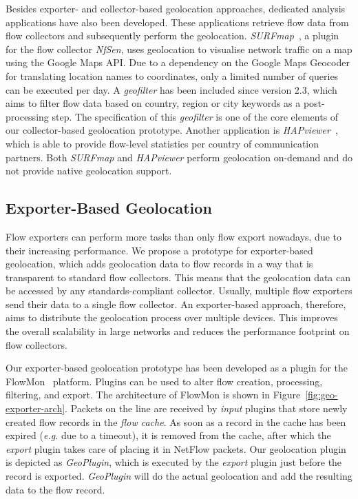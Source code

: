 Besides exporter- and collector-based geolocation approaches, dedicated analysis applications have also been developed. These applications retrieve flow data from flow collectors and subsequently perform the geolocation. \textit{SURFmap}~\cite{Hofstede--SURFmap, Hofstede-2009-SURFmap}, a plugin for the flow collector \textit{NfSen}, uses geolocation to visualise network traffic on a map using the Google Maps API. Due to a dependency on the Google Maps Geocoder for translating location names to coordinates, only a limited number of queries can be executed per day. A \textit{geofilter} has been included since version 2.3, which aims to filter flow data based on country, region or city keywords as a post-processing step. The specification of this \textit{geofilter} is one of the core elements of our collector-based geolocation prototype. Another application is \textit{HAPviewer}~\cite{Blatter-2011-Extending}, which is able to provide flow-level statistics per country of communication partners. Both \textit{SURFmap} and \textit{HAPviewer} perform geolocation on-demand and do not provide native geolocation support.

\subsection{Exporter-Based Geolocation} \label{subsec:geo-exporter_based_geolocation}

Flow exporters can perform more tasks than only flow export nowadays, due to their increasing performance. We propose a prototype for exporter-based geolocation, which adds geolocation data to flow records in a way that is transparent to standard flow collectors. This means that the geolocation data can be accessed by any standards-compliant collector. Usually, multiple flow exporters send their data to a single flow collector. An exporter-based approach, therefore, aims to distribute the geolocation process over multiple devices. This improves the overall scalability in large networks and reduces the performance footprint on flow collectors.

Our exporter-based geolocation prototype has been developed as a plugin for the FlowMon~\cite{FlowmonNetworks--Flowmon} platform. Plugins can be used to alter flow creation, processing, filtering, and export. The architecture of FlowMon is shown in Figure~\ref{fig:geo-exporter-arch}. Packets on the line are received by \textit{input} plugins that store newly created flow records in the \textit{flow cache}. As soon as a record in the cache has been expired (\textit{e.g.} due to a timeout), it is removed from the cache, after which the \textit{export} plugin takes care of placing it in NetFlow packets. Our geolocation plugin is depicted as \textit{GeoPlugin}, which is executed by the \textit{export} plugin just before the record is exported. \textit{GeoPlugin} will do the actual geolocation and add the resulting data to the flow record.

